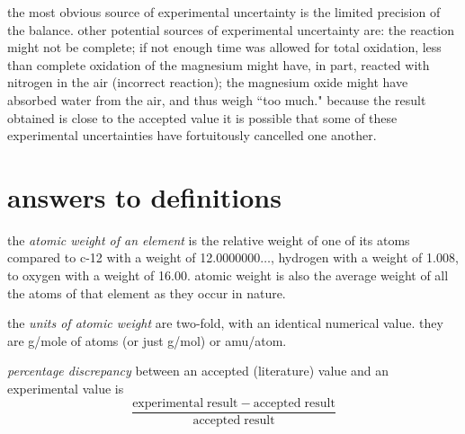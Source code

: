 \documentclass{article}
\begin{document}
the most obvious source of experimental uncertainty is the limited
precision of the balance. other potential sources of experimental
uncertainty are: the reaction might not be complete; if not enough
time was allowed for total oxidation, less than complete oxidation of
the magnesium might have, in part, reacted with nitrogen in the air
(incorrect reaction); the magnesium oxide might have absorbed water
from the air, and thus weigh ``too much." because the result obtained
is close to the accepted value it is possible that some of these
experimental uncertainties have fortuitously cancelled one another.


\section{answers to definitions}

\begin{enumerate}
  \begin{item}
    the \emph{atomic weight of an element} is the relative weight of
    one of its atoms compared to c-12 with a weight of
    12.0000000$\ldots$, hydrogen with a weight of 1.008, to oxygen
    with a weight of 16.00. atomic weight is also the average weight
    of all the atoms of that element as they occur in nature.
  \end{item}
  \begin{item}
    the \emph{units of atomic weight} are two-fold, with an identical
    numerical value. they are g/mole of atoms (or just g/mol) or
    amu/atom.
  \end{item}
  \begin{item}
    \emph{percentage discrepancy} between an accepted (literature)
    value and an experimental value is
    \begin{equation*}
      \frac{\mathrm{experimental\;result} - \mathrm{accepted\;result}}{\mathrm{accepted\;result}}
    \end{equation*}
  \end{item}
\end{enumerate}

\end{document}
